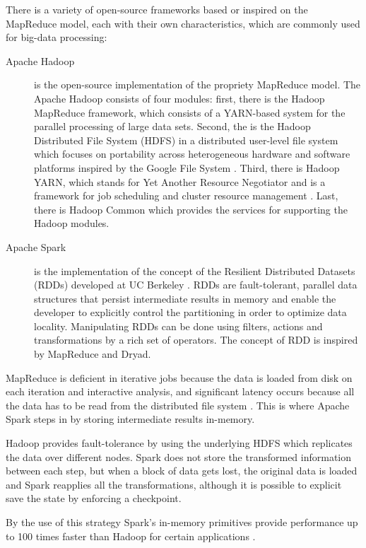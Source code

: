 There is a variety of open-source frameworks based or inspired on the MapReduce model, each with their own characteristics, which are commonly used for big-data processing:
\begin{description}
    \item[Apache Hadoop] is the open-source implementation of the propriety MapReduce model. The Apache Hadoop consists of four modules: first, there is the Hadoop MapReduce framework, which consists of a YARN-based system for the parallel processing of large data sets. Second, the is the Hadoop Distributed File System (HDFS) in a distributed user-level file system which focuses on portability across heterogeneous hardware and software platforms \cite{5452045} inspired by the Google File System \cite{Ghemawat:2003:GFS:1165389.945450}. Third, there is Hadoop YARN, which stands for Yet Another Resource Negotiator and is a framework for job scheduling and cluster resource management \cite{Vavilapalli:2013:AHY:2523616.2523633}. Last, there is Hadoop Common which provides the services for supporting the Hadoop modules.
    \item[Apache Spark] is the implementation of the concept of the Resilient Distributed Datasets (RDDs) developed at UC Berkeley \cite{180560}. RDDs are fault-tolerant, parallel data structures that persist intermediate results in memory and enable the developer to explicitly control the partitioning in order to optimize data locality. Manipulating RDDs can be done using filters, actions and transformations by a rich set of operators. The concept of RDD is inspired by MapReduce and Dryad.
\end{description}

MapReduce is deficient in iterative jobs because the data is loaded from disk on each iteration and interactive analysis, and significant latency occurs because all the data has to be read from the distributed file system \cite{Zaharia:2010:SCC:1863103.1863113}. This is where Apache Spark steps in by storing intermediate results in-memory.

Hadoop provides fault-tolerance by using the underlying HDFS which replicates the data over different nodes. Spark does not store the transformed information between each step, but when a block of data gets lost, the original data is loaded and Spark reapplies all the transformations, although it is possible to explicit save the state by enforcing a checkpoint.

By the use of this strategy Spark's in-memory primitives provide performance up to 100 times faster than Hadoop for certain applications \cite{Xin:2013:SSR:2463676.2465288}.